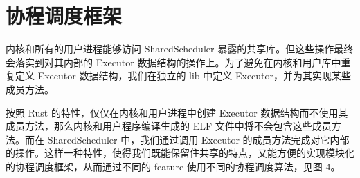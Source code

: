 \section{协程调度框架}

内核和所有的用户进程能够访问 SharedScheduler 暴露的共享库。但这些操作最终会落实到对其内部的 Executor 数据结构的操作上。为了避免在内核和用户库中重复定义 Executor 数据结构，我们在独立的 lib 中定义 Executor，并为其实现某些成员方法。

按照 Rust 的特性，仅仅在内核和用户进程中创建 Executor 数据结构而不使用其成员方法，那么内核和用户程序编译生成的 ELF 文件中将不会包含这些成员方法。而在 SharedScheduler 中，我们通过调用 Executor 的成员方法完成对它内部的操作。这样一种特性，使得我们既能保留住共享的特点，又能方便的实现模块化的协程调度框架，从而通过不同的 feature 使用不同的协程调度算法，见图 4。

